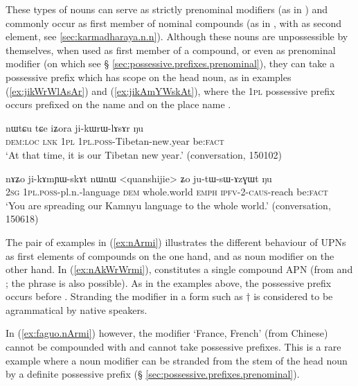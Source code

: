 These types of nouns can serve as strictly prenominal modifiers (as in ) and commonly occur as first member of nominal compounds (as in , with  as second element, see \ref{sec:karmadharaya.n.n}). Although these nouns are  unpossessible by themselves, when used as first member of a compound, or even as prenominal modifier (on which see § \ref{sec:possessive.prefixes.prenominal}), they can take a possessive prefix which has scope on the head noun, as in examples (\ref{ex:jikWrWlAsAr}) and (\ref{ex:jikAmYWskAt}), where the \textsc{1pl} possessive prefix  occurs prefixed on the name  and on the place name  .

\begin{exe}
\ex \label{ex:jikWrWlAsAr}
 \gll nɯtɕu tɕe iʑora ji-kɯrɯ-lɤsɤr ŋu \\
 \textsc{dem}:\textsc{loc} \textsc{lnk} \textsc{1pl} \textsc{1pl}.\textsc{poss}-Tibetan-new.year be:\textsc{fact} \\
 \glt `At that time, it is our Tibetan new year.' (conversation, 150102)
\end{exe}

\begin{exe}
\ex \label{ex:jikAmYWskAt}
 \gll nɤʑo ji-kɤmɲɯ-skɤt nɯnɯ <quanshijie> ʑo ju-tɯ-sɯ-ɤzɣɯt ŋu \\
 \textsc{2sg} \textsc{1pl}.\textsc{poss}-pl.n.-language \textsc{dem} whole.world \textsc{emph} \textsc{ipfv}-2-\textsc{caus}-reach be:\textsc{fact} \\
  \glt `You are spreading our Kamnyu language to the whole world.' (conversation, 150618)
\end{exe}

The pair of examples in (\ref{ex:nArmi}) illustrates the different behaviour of UPNs as first elements of compounds on the one hand, and as noun modifier on the other hand. In (\ref{ex:nAkWrWrmi}),   constitutes a single compound APN (from  and ; the phrase  is also possible).  As in the examples above, the possessive prefix occurs before . Stranding the modifier in a form such as $\dagger$ is considered to be agrammatical by native speakers.
 
In (\ref{ex:faguo.nArmi}) however, the modifier  `France, French' (from Chinese) cannot be compounded with   and cannot take possessive prefixes. This is a rare example where a noun modifier can be stranded from the stem of the head noun by a definite possessive prefix (§ \ref{sec:possessive.prefixes.prenominal}).

